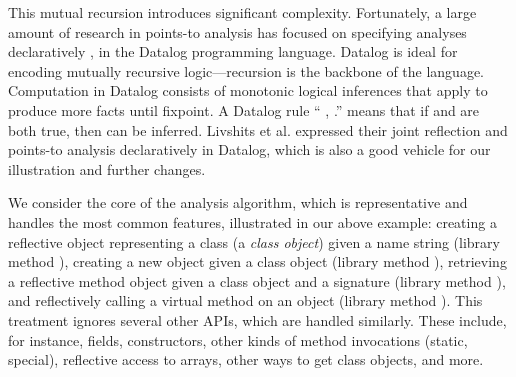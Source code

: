 This mutual recursion introduces significant complexity.  Fortunately,
a large amount of research in points-to analysis has focused on
specifying analyses declaratively
\cite{repsdb,aplas/WhaleyACL05,pods/LamWLMACU05,pldi/WhaleyL04,oopsla/BravenboerS09,cc/KastrinisS13,issta/BravenboerS09,pldi/KastrinisS13,pldi/NaikAW06,pldi/LiangN11,uss/GuarnieriL09},
in the Datalog programming language. Datalog is ideal for encoding
mutually recursive logic---recursion is the backbone of the
language. Computation in Datalog consists of monotonic logical
inferences that apply to produce more facts until fixpoint. A Datalog
rule ``  , .''
means that if  and  are both true, then
 can be inferred. Livshits et al. expressed their joint
reflection and points-to analysis declaratively in Datalog, which is
also a good vehicle for our illustration and further changes.


We consider the core of the analysis algorithm, which is
representative and handles the most common features, illustrated in
our above example: creating a reflective object representing a class
(a \emph{class object}) given a name string (library method
), creating a new object given a class
object (library method ), retrieving
a reflective method object given a class object and a signature
(library method ), and reflectively
calling a virtual method on an object (library method
). This treatment ignores several other
APIs, which are handled similarly. These include, for instance,
fields, constructors, other kinds of method invocations (static,
special), reflective access to arrays, other ways to get class
objects, and more.


